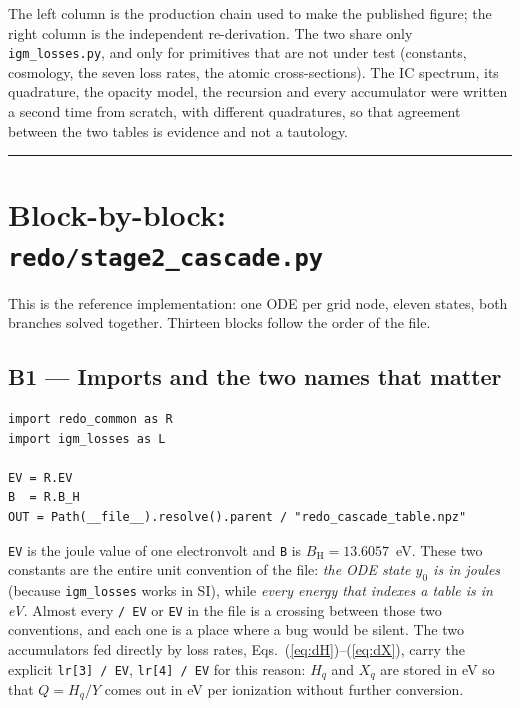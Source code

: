 \documentclass[11pt,a4paper]{article}
\newcommand{\code}[1]{\texttt{\small #1}}
\newcommand{\file}[1]{\texttt{\small #1}}
\newcommand{\BH}{B_{\mathrm{H}}}
\begin{document}
\noindent
The left column is the production chain used to make the published figure; the
right column is the independent re-derivation.  The two share only
\file{igm\_losses.py}, and only for primitives that are not under test
(constants, cosmology, the seven loss rates, the atomic cross-sections).  The
IC spectrum, its quadrature, the opacity model, the recursion and every
accumulator were written a second time from scratch, with different
quadratures, so that agreement between the two tables is evidence and not a
tautology.

\bigskip
\hrule

\section{Block-by-block: \file{redo/stage2\_cascade.py}}

This is the reference implementation: one ODE per grid node, eleven states,
both branches solved together.  Thirteen blocks follow the order of the file.

\subsection*{B1 --- Imports and the two names that matter}

\begin{lstlisting}
import redo_common as R
import igm_losses as L

EV = R.EV
B  = R.B_H
OUT = Path(__file__).resolve().parent / "redo_cascade_table.npz"
\end{lstlisting}

\code{EV} is the joule value of one electronvolt and \code{B} is
$\BH = 13.6057$~eV.  These two constants are the entire unit convention of the
file: \emph{the ODE state $y_0$ is in joules} (because \code{igm\_losses}
works in SI), while \emph{every energy that indexes a table is in eV}.  Almost
every \code{/ EV} or \code{* EV} in the file is a crossing between those two
conventions, and each one is a place where a bug would be silent.  The two
accumulators fed directly by loss rates, Eqs.~(\ref{eq:dH})--(\ref{eq:dX}),
carry the explicit \code{lr[3] / EV}, \code{lr[4] / EV} for this reason:
$H_q$ and $X_q$ are stored in eV so that $Q = H_q/Y$ comes out in eV per
ionization without further conversion.
\end{document}
